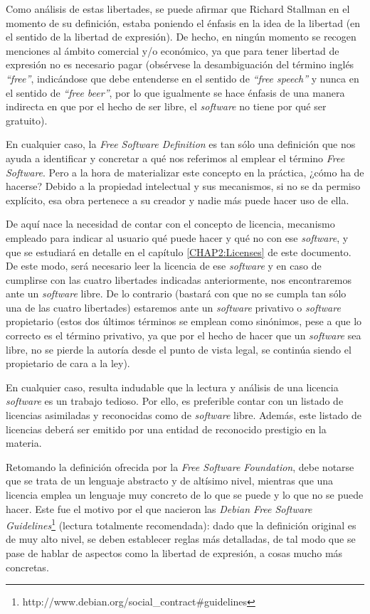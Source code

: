Como análisis de estas libertades, se puede afirmar que Richard Stallman en el
momento de su definición, estaba poniendo el énfasis en la idea de la libertad
(en el sentido de la libertad de expresión). De hecho, en ningún momento se
recogen menciones al ámbito comercial y/o económico, ya que para tener libertad
de expresión no es necesario pagar (obsérvese la desambiguación del término
inglés \textit{``free''}, indicándose que debe entenderse en el sentido de
\textit{``free speech''} y nunca en el sentido de \textit{``free beer''}, por lo
que igualmente se hace énfasis de una manera indirecta en que por el hecho de
ser libre, el \textit{software} no tiene por qué ser gratuito).

En cualquier caso, la \textit{Free Software Definition} es tan sólo una
definición que nos ayuda a identificar y concretar a qué nos referimos al
emplear el término \textit{Free Software}. Pero a la hora de materializar este
concepto en la práctica, ¿cómo ha de hacerse? Debido a la propiedad intelectual
y sus mecanismos, si no se da permiso explícito, esa obra pertenece a su creador
y nadie más puede hacer uso de ella.

De aquí nace la necesidad de contar con el concepto de licencia, mecanismo
empleado para indicar al usuario qué puede hacer y qué no con ese
\textit{software}, y que se estudiará en detalle en el capítulo
\ref{CHAP2:Licenses} de este documento. De este modo, será necesario
leer la licencia de ese \textit{software} y en caso de cumplirse con las cuatro
libertades indicadas anteriormente, nos encontraremos ante un \textit{software}
libre. De lo contrario (bastará con que no se cumpla tan sólo una de las cuatro
libertades) estaremos ante un \textit{software} privativo o \textit{software}
propietario (estos dos últimos términos se emplean como sinónimos, pese a que lo
correcto es el término privativo, ya que por el hecho de hacer que un
\textit{software} sea libre, no se pierde la autoría desde el punto de vista
legal, se continúa siendo el propietario de cara a la ley).

En cualquier caso, resulta indudable que la lectura y análisis de una licencia
\textit{software} es un trabajo tedioso. Por ello, es preferible contar con un
listado de licencias asimiladas y reconocidas como de \textit{software} libre.
Además, este listado de licencias deberá ser emitido por una entidad de
reconocido prestigio en la materia.

Retomando la definición ofrecida por la \textit{Free Software Foundation}, debe
notarse que se trata de un lenguaje abstracto y de altísimo nivel, mientras que
una licencia emplea un lenguaje muy concreto de lo que se puede y lo que no se
puede hacer. Este fue el motivo por el que nacieron las \textit{Debian Free
Software Guidelines}\footnote{http://www.debian.org/social_contract#guidelines}
(lectura totalmente recomendada): dado que la definición original es de muy alto
nivel, se deben establecer reglas más detalladas, de tal modo que se pase de
hablar de aspectos como la libertad de expresión, a cosas mucho más concretas.


